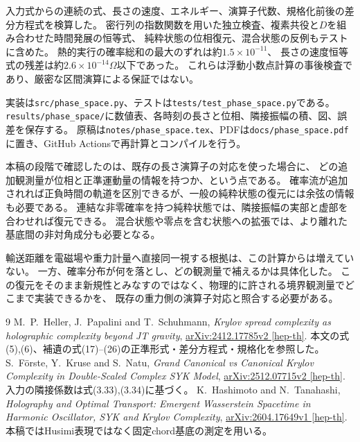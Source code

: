 \documentclass[a4paper,11pt]{ltjsarticle}
\numberwithin{equation}{section}
\begin{document}
入力式からの連続の式、長さの速度、エネルギー、演算子代数、規格化前後の差分方程式を検算した。
密行列の指数関数を用いた独立検査、複素共役と$D$を組み合わせた時間発展の恒等式、
純粋状態の位相復元、混合状態の反例もテストに含めた。
熱的実行の確率総和の最大のずれは約$1.5\times10^{-11}$、
長さの速度恒等式の残差は約$2.6\times10^{-14}\Omega$以下であった。
これらは浮動小数点計算の事後検査であり、厳密な区間演算による保証ではない。

実装は\nolinkurl{src/phase_space.py}、テストは\nolinkurl{tests/test_phase_space.py}である。
\nolinkurl{results/phase_space/}に数値表、各時刻の長さと位相、隣接振幅の積、図、誤差を保存する。
原稿は\nolinkurl{notes/phase_space.tex}、PDFは\nolinkurl{docs/phase_space.pdf}に置き、GitHub Actionsで再計算とコンパイルを行う。

本稿の段階で確認したのは、既存の長さ演算子の対応を使った場合に、
どの追加観測量が位相と正準運動量の情報を持つか、という点である。
確率流が追加されれば正負時間の軌道を区別できるが、一般の純粋状態の復元には余弦の情報も必要である。
連結な非零確率を持つ純粋状態では、隣接振幅の実部と虚部を合わせれば復元できる。
混合状態や零点を含む状態への拡張では、より離れた基底間の非対角成分も必要となる。

輸送距離を電磁場や重力計量へ直接同一視する根拠は、この計算からは増えていない。
一方、確率分布が何を落とし、どの観測量で補えるかは具体化した。
この復元をそのまま新規性とみなすのではなく、物理的に許される境界観測量でどこまで実装できるかを、
既存の重力側の演算子対応と照合する必要がある。

\begin{thebibliography}{9}
M.~P.~Heller, J.~Papalini and T.~Schuhmann,
\emph{Krylov spread complexity as holographic complexity beyond JT gravity},
\href{https://arxiv.org/abs/2412.17785v2}{arXiv:2412.17785v2 [hep-th]}.
本文の式(5),(6)、補遺の式(17)--(26)の正準形式・差分方程式・規格化を参照した。
S.~F\"orste, Y.~Kruse and S.~Natu,
\emph{Grand Canonical vs Canonical Krylov Complexity in Double-Scaled Complex SYK Model},
\href{https://arxiv.org/abs/2512.07715v2}{arXiv:2512.07715v2 [hep-th]}.
入力の隣接係数は式(3.33),(3.34)に基づく。
K.~Hashimoto and N.~Tanahashi,
\emph{Holography and Optimal Transport: Emergent Wasserstein Spacetime in Harmonic Oscillator, SYK and Krylov Complexity},
\href{https://arxiv.org/abs/2604.17649v1}{arXiv:2604.17649v1 [hep-th]}.
本稿ではHusimi表現ではなく固定chord基底の測定を用いる。
\end{thebibliography}
\end{document}
